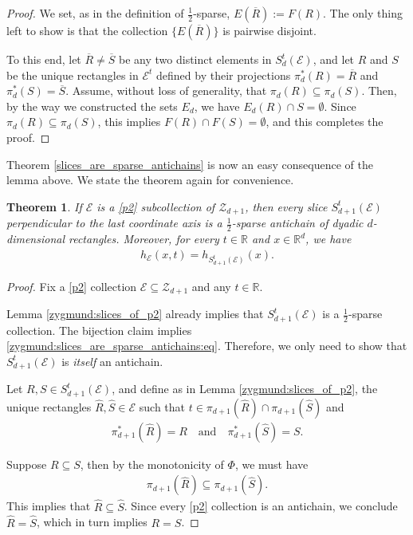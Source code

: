 \documentclass[oneside]{amsart}
\newtheorem{theorem}{Theorem}
\theoremstyle{definition}
\theoremstyle{plain}
\numberwithin{equation}{section}
\numberwithin{theorem}{section}
\begin{document}
\begin{proof}
  We set, as in the definition of $\frac{1}{2}$-sparse,
  $E(\overline{R}) := F(R)$.
  The only thing left to show is that the collection $\{E(\overline{R})\}$ is
  pairwise disjoint.

  To this end, let $\overline{R} \neq \overline{S}$ be any two distinct elements
  in $S_d^t(\mathcal{E})$, and let $R$ and $S$ be the unique rectangles in
  $\mathcal{E}^t$ defined by their projections $\pi_d^*(R) = \overline{R}$
  and $\pi_d^*(S) = \overline{S}$.
  Assume, without loss of generality, that $\pi_d(R) \subseteq \pi_d(S)$.
  Then, by the way we constructed the sets $E_d$, we have
  $E_d(R) \cap S = \emptyset$. Since $\pi_d(R) \subseteq \pi_d(S)$, this implies
  $F(R) \cap F(S) = \emptyset$, and this completes the proof.
\end{proof}

Theorem \ref{slices_are_sparse_antichains} is now an easy consequence of the
lemma above. We state the theorem again for convenience.
\begin{theorem}
  \label{zygmund:slices_are_sparse_antichains}
  If $\mathcal{E}$ is a \eqref{p2} subcollection of $\mathcal{Z}_{d+1}$, then
  every slice $S_{d+1}^t(\mathcal{E})$ perpendicular to the last coordinate axis
  is a $\frac{1}{2}$-sparse antichain of dyadic $d$-dimensional rectangles.
  Moreover, for every $t \in \mathbb{R}$ and $x \in \mathbb{R}^d$,  we have
  \begin{align} \label{zygmund:slices_are_sparse_antichains:eq}
    h_{\mathcal{E}}(x,t) = h_{S_{d+1}^t(\mathcal{E})}(x).
  \end{align}
\end{theorem}
\begin{proof}
  Fix a \eqref{p2} collection $\mathcal{E} \subseteq \mathcal{Z}_{d+1}$ and any
  $t \in \mathbb{R}$.

  Lemma \ref{zygmund:slices_of_p2} already implies that $S_{d+1}^t(\mathcal{E})$
  is a $\frac{1}{2}$-sparse collection.
  The bijection claim implies \eqref{zygmund:slices_are_sparse_antichains:eq}.
  Therefore, we only need to show that $S_{d+1}^t(\mathcal{E})$ is \emph{itself}
  an antichain.

  Let $R,S \in S_{d+1}^t(\mathcal{E})$, and define as in Lemma
  \ref{zygmund:slices_of_p2}, the unique rectangles
  $\widehat{R}, \widehat{S} \in \mathcal{E}$ such that
  $t \in \pi_{d+1}(\widehat{R}) \cap \pi_{d+1}(\widehat{S})$ and
  \begin{align*}
    \pi_{d+1}^*(\widehat{R}) = R \quad\text{and}\quad
    \pi_{d+1}^*(\widehat{S}) = S.
  \end{align*}

  Suppose $R \subseteq S$, then by the monotonicity of $\Phi$, we must have
  \begin{align*}
    \pi_{d+1}(\widehat{R}) \subseteq \pi_{d+1}(\widehat{S}).
  \end{align*}
  This implies that $\widehat{R} \subseteq \widehat{S}$.
  Since every \eqref{p2} collection is an antichain, we conclude
  $\widehat{R} = \widehat{S}$, which in turn implies $R = S$.
\end{proof}
\end{document}
